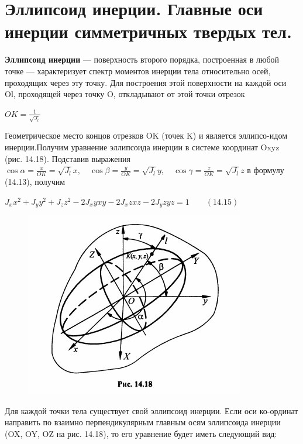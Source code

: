 {%
\section{Эллипсоид инерции. Главные оси инерции симметричных твердых тел.}
\begin{center}
    \par \textbf{Эллипсоид инерции} — поверхность второго порядка, построенная в любой точке  —  характеризует  спектр  моментов  инерции  тела  относительно  осей, проходящих через эту точку. Для построения этой поверхности на каждой оси Ol, проходящей через точку O, откладывают от этой точки отрезок

    \par $OK = \frac{1}{\sqrt{J_l}}$

    \par Геометрическое место концов отрезков OK (точек K) и является эллипсо-идом инерции.Получим  уравнение  эллипсоида  инерции  в  системе  координат  Oxyz (рис. 14.18). Подставив выражения $\cos{\alpha} = \frac{x}{OK} = \sqrt{J_l} x, \quad \cos{\beta} = \frac{y}{OK} = \sqrt{J_l} y, \quad \cos{\gamma} = \frac{z}{OK} = \sqrt{J_l} z$ в формулу (14.13), получим

    \par $J_x x^2 + J_y y^2 + J_z z^2 - 2J_xy xy - 2J_xz xz - 2J_yz yz = 1 \qquad (14.15)$

    \begin{figure}[H]
    \centering\includegraphics[scale=0.7]{img/14.18.jpg} 
    \end{figure}

    \par Для каждой точки тела существует свой эллипсоид инерции. Если оси ко-ординат  направить по  взаимно  перпендикулярным  главным  осям эллипсоида инерции (OX, OY, OZ  на рис. 14.18), то его уравнение будет иметь следующий вид:


\end{center}}
